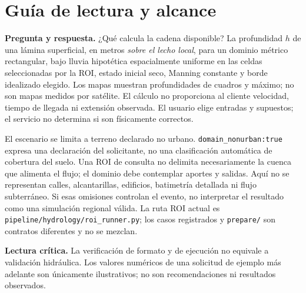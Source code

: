 \documentclass[11pt,a4paper]{article}
\newcommand{\src}[1]{\nolinkurl{#1}}
\newcommand{\warn}[1]{\par\noindent\colorbox{blue!8}{\parbox{.965\linewidth}{\textbf{Lectura crítica.} #1}}\par}
\begin{document}
\section{Guía de lectura y alcance}
\label{sec:alcance}
\begin{center}
\end{center}
\noindent\textbf{Pregunta y respuesta.} ¿Qué calcula la cadena disponible? La profundidad $h$ de una lámina superficial, en metros \emph{sobre el lecho local}, para un dominio métrico rectangular, bajo lluvia hipotética espacialmente uniforme en las celdas seleccionadas por la ROI, estado inicial seco, Manning constante y borde idealizado elegido. Los mapas muestran profundidades de cuadros y máximo; no son mapas medidos por satélite. El cálculo no proporciona al cliente velocidad, tiempo de llegada ni extensión observada. El usuario elige entradas y supuestos; el servicio no determina si son físicamente correctos.

El escenario se limita a terreno declarado no urbano. \texttt{domain\_nonurban:true} expresa una declaración del solicitante, no una clasificación automática de cobertura del suelo. Una ROI de consulta no delimita necesariamente la cuenca que alimenta el flujo; el dominio debe contemplar aportes y salidas. Aquí no se representan calles, alcantarillas, edificios, batimetría detallada ni flujo subterráneo. Si esas omisiones controlan el evento, no interpretar el resultado como una simulación regional válida. La ruta ROI actual es \src{pipeline/hydrology/roi_runner.py}; los casos registrados y \texttt{prepare/} son contratos diferentes y no se mezclan.

\warn{La verificación de formato y de ejecución no equivale a validación hidráulica. Los valores numéricos de una solicitud de ejemplo más adelante son únicamente ilustrativos; no son recomendaciones ni resultados observados.}
\end{document}
